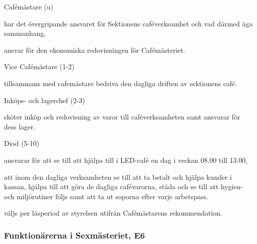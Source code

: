\documentclass[10pt]{article}
\begin{document}
\begin{emptylist}
    \item Cafémästare (u)
        \begin{dashlist}
            \item har det övergripande ansvaret för Sektionens
                caféverksamhet och vad därmed äga sammanhang,
            \item ansvar för den ekonomiska redovisningen för
                Cafémästeriet.
        \end{dashlist}
    \item Vice Cafémästare (1-2)
        \begin{dashlist}
            \item tillsammans med cafemästare bedriva den dagliga driften
                av sektionens café.
        \end{dashlist}
    \item Inköps- och lagerchef (2-3)
        \begin{dashlist}
            \item sköter inköp och redovisning av varor till
                caféverksamheten samt ansvarar för dess lager.
        \end{dashlist}
    \item Diod (5-10)
    		\begin{dashlist}
            \item ansvarar för att se till att hjälpa till i LED-café en dag i veckan 08.00 till 13.00,
            \item att inom den dagliga verksamheten se till att ta betalt och hjälpa kunder i kassan, hjälpa till att göra de dagliga cafévarorna, städa och se till att hygien- och miljörutiner följs samt att ta ut soporna efter varje arbetspass.
            \item väljs per läsperiod av styrelsen utifrån Cafémästarens rekommendation.
        \end{dashlist}
\end{emptylist}
\subsubsection{Funktionärerna i Sexmästeriet, E6}
\end{document}
